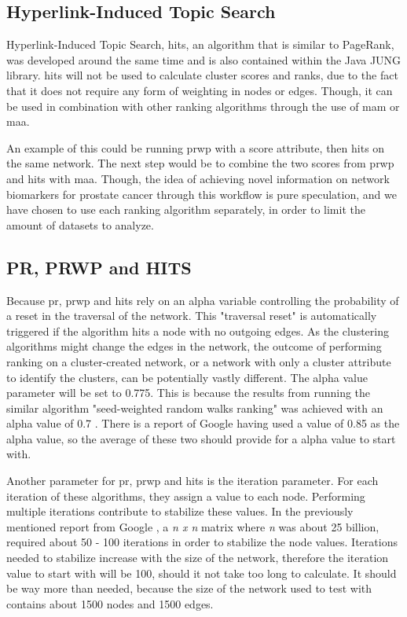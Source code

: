 \subsection{Hyperlink-Induced Topic Search}
Hyperlink-Induced Topic Search, \gls{hits}, an algorithm that is similar to PageRank,
was developed around the same time \cite{hits}\cite{hits-origin} and is also
contained within the Java JUNG library. \gls{hits} will not be used to calculate
cluster scores and ranks, due to the fact that it does not require any form of
weighting in nodes or edges. Though, it can be used in combination with other
ranking algorithms through the use of \gls{mam} or \gls{maa}. 

An example of this could be running \gls{prwp} with a score attribute, then \gls{hits} on
the same network. The next step would be to combine the two scores from \gls{prwp} and
\gls{hits} with \gls{maa}. Though, the idea of achieving novel information on network
biomarkers for prostate cancer through this workflow is pure speculation, and we
have chosen to use each ranking algorithm separately, in order to limit the
amount of datasets to analyze.

\subsection{PR, PRWP and HITS}
Because \gls{pr}, \gls{prwp} and \gls{hits} rely on an alpha variable controlling the probability
of a reset in the traversal of the network. This "traversal reset" is
automatically triggered if the algorithm hits a node with no outgoing edges. As
the clustering algorithms might change the edges in the network, the outcome of
performing ranking on a cluster-created network, or a network with only
a cluster attribute to identify the clusters, can be potentially vastly
different. The alpha value parameter will be set to 0.775. This is because the
results from running the similar algorithm "seed-weighted random walks ranking"
was achieved with an alpha value of 0.7 \cite{sw-rwr}. There is a report of
Google having used a value of 0.85 \cite{pr-parameters} as the alpha value, so
the average of these two should provide for a alpha value to start with.

Another parameter for \gls{pr}, \gls{prwp} and \gls{hits} is the iteration parameter. For each
iteration of these algorithms, they assign a value to each node. Performing
multiple iterations contribute to stabilize these values. In the previously
mentioned report from Google \cite{pr-parameters}, a \textit{n x n} matrix where
\textit{n} was about 25 billion, required about 50 - 100 iterations in order to
stabilize the node values. Iterations needed to stabilize increase with the size
of the network, therefore the iteration value to start with will be 100, should
it not take too long to calculate. It should be way more than needed, because
the size of the network used to test with contains about 1500 nodes and 1500
edges.



